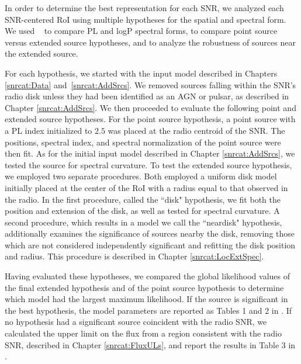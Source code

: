 In order to determine the best representation for each SNR, we analyzed each SNR-centered RoI using multiple hypotheses for the spatial and spectral form. We used \ptlike{}~\citep{Kerr10} to compare PL and logP spectral forms, to compare point source versus extended source hypotheses, and to analyze the robustness of sources near the extended source.

For each hypothesis, we started with the input model described in Chapters \ref{snrcat:Data} and~\ref{snrcat:AddSrcs}. We removed sources falling within the SNR's radio disk unless they had been identified as an AGN or pulsar, as described in Chapter \ref{snrcat:AddSrcs}. We then proceeded to evaluate the following point and extended source hypotheses. For the point source hypothesis, a point source with a PL index initialized to $2.5$ was placed at the radio centroid of the SNR. The positions, spectral index, and spectral normalization of the point source were then fit. As for the initial input model described in Chapter \ref{snrcat:AddSrcs}, we tested the source for spectral curvature. To test the extended source hypothesis, we employed two separate procedures. Both employed a uniform disk model initially placed at the center of the RoI with a radius equal to that observed in the radio. In the first procedure, called the ``disk" hypothesis, we fit both the position and extension of the disk, as well as tested for spectral curvature. A second procedure, which results in a model we call the ``neardisk" hypothesis, additionally examines the significance of sources nearby the disk, removing those which are not considered independently significant and refitting the disk position and radius. This procedure is described in Chapter \ref{snrcat:LocExtSpec}.

Having evaluated these hypotheses, we compared the global likelihood values of the final extended hypothesis and of the point source hypothesis to determine which model had the largest maximum likelihood. If the source is significant in the best hypothesis, the model parameters are reported as Tables 1 and 2 in \cite{snrCat} . If no hypothesis had a significant \gam{} source coincident with the radio SNR, we calculated the upper limit on the flux from a region consistent with the radio SNR, described in Chapter \ref{snrcat:FluxULs}, and report  the results in Table 3 in \cite{snrCat}. 

